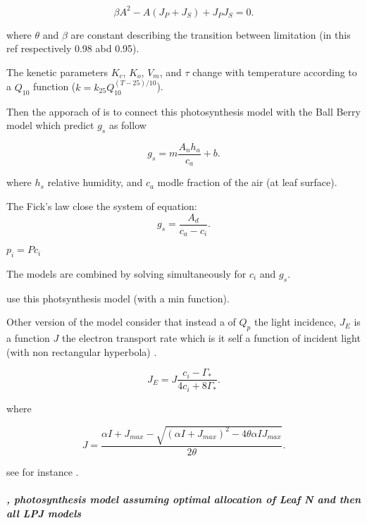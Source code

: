 \documentclass[a4paper,11pt]{article}
\begin{document}
\begin{equation}
\label{eq:Q2}
\beta A^2 - A(J_P+J_S) + J_P J_S= 0.
\end{equation}

where $\theta$ and $\beta$ are constant describing the transition between limitation (in this ref respectively 0.98 abd 0.95).

The kenetic parameters $K_c$, $K_o$, $V_m$, and $\tau$ change with temperature according to a $Q_{10}$ function ($k = k_{25} Q_{10}^{(T-25)/10}$).

Then the apporach of \citet{Collatz-1991} is to connect this photosynthesis model with the Ball Berry model which predict $g_s$  as follow

\begin{equation}
\label{eq:gs}
g_s= m \frac{A_n h_a}{c_a}+b.
\end{equation}

where $h_s$ relative humidity, and $c_a$ modle fraction of the air (at leaf surface).

The Fick's law close the system of equation:
\begin{equation}
\label{eq:fick}
g_s=\frac{A_d}{c_a - c_i}.
\end{equation}

$p_i = P c_i$

The models are combined by solving simultaneously for $c_i$ and $g_s$.

\citet{Scheiter-2009} use this photsynthesis model (with a min function).

Other version of the model consider that instead a of $Q_p$ the light incidence, $J_E$ is a function $J$ the electron transport rate which is it self a function of incident light (with non rectangular hyperbola) \citep{Sharkey-2007}.

\begin{equation}
\label{eq:JCb}
J_E = J \frac{ c_i - \Gamma_*}{4c_i + 8 \Gamma_*}.
\end{equation}

where

\begin{equation}
\label{eq:Jlight}
J = \frac{ \alpha I + J_{max} - \sqrt{(\alpha I + J_{max})^2 - 4 \theta \alpha I J_{max}}}{2\theta}.
\end{equation}

see for instance \citet{Bernacchi-2009}.


\subparagraph{\citet{Haxeltine-1996}, photosynthesis model assuming optimal allocation of Leaf N and then all LPJ models}
\end{document}
